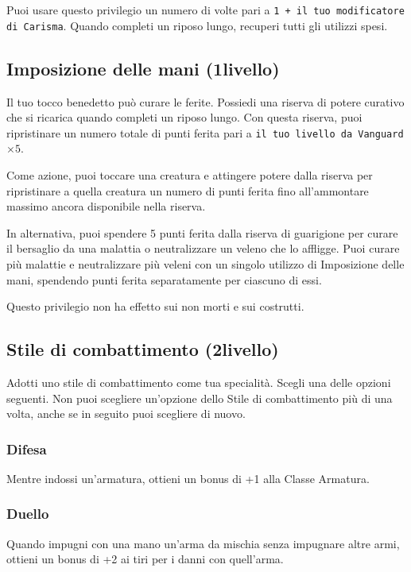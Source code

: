\documentclass[a4paper,10pt,twoside,twocolumn,openany,bg=full,nodeprecatedcode]{dndbook}
\begin{document}
Puoi usare questo privilegio un numero di volte pari a \texttt{1 + il tuo modificatore di Carisma}.
Quando completi un riposo lungo, recuperi tutti gli utilizzi spesi.

\subsection{Imposizione delle mani (1\degree livello)}

Il tuo tocco benedetto può curare le ferite.
Possiedi una riserva di potere curativo che si ricarica quando completi un riposo lungo.
Con questa riserva, puoi ripristinare un numero totale di punti ferita pari a \texttt{il tuo livello da Vanguard} \(\times 5\).

Come azione, puoi toccare una creatura e attingere potere dalla riserva per ripristinare a quella creatura un numero di punti ferita fino all'ammontare massimo ancora disponibile nella riserva.

In alternativa, puoi spendere 5 punti ferita dalla riserva di guarigione per curare il bersaglio da una malattia o neutralizzare un veleno che lo affligge.
Puoi curare più malattie e neutralizzare più veleni con un singolo utilizzo di Imposizione delle mani, spendendo punti ferita separatamente per ciascuno di essi.

Questo privilegio non ha effetto sui non morti e sui costrutti.

\subsection{Stile di combattimento (2\degree livello)}

Adotti uno stile di combattimento come tua specialità.
Scegli una delle opzioni seguenti.
Non puoi scegliere un'opzione dello Stile di combattimento più di una volta, anche se in seguito puoi scegliere di nuovo.

\subsubsection{Difesa}
Mentre indossi un'armatura, ottieni un bonus di +1 alla Classe Armatura.

\subsubsection{Duello}
Quando impugni con una mano un'arma da mischia senza impugnare altre armi, ottieni un bonus di +2 ai tiri per i danni con quell'arma.
\end{document}
